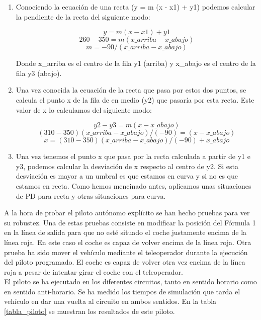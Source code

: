 \begin{enumerate}
    \item Conociendo la ecuación de una recta (y = m (x - x1) + y1) podemos calcular la pendiente de la recta del siguiente modo:
    
        \[ y = m (x - x1) + y1 \]
        \[ 260 - 350 = m (x\_arriba - x\_abajo) \]
        \[ m = -90 / (x\_arriba - x\_abajo) \]
        
     Donde x\_arriba es el centro de la fila y1 (arriba) y x\_abajo es el centro de la fila y3 (abajo).
        
    \item Una vez conocida la ecuación de la recta que pasa por estos dos puntos, se calcula el punto x de la fila de en medio (y2) que pasaría por esta recta. Este valor de x lo calculamos del siguiente modo:
        
        \[ y2 - y3 = m (x - x\_abajo) \]
        \[ (310 - 350) (x\_arriba - x\_abajo) / (-90) = (x - x\_abajo)  \]
        \[ x = (310 - 350) (x\_arriba - x\_abajo) / (-90) + x\_abajo  \]
        
    \item  Una vez tenemos el punto x que pasa por la recta calculada a partir de y1 e y3, podemos calcular la desviación de x respecto al centro de y2. Si esta desviación es mayor a un umbral es que estamos en curva y si no es que estamos en recta. Como hemos mencinado antes, aplicamos unas situaciones de PD para recta y otras situaciones para curva.
    
\end{enumerate}

A la hora de probar el piloto autónomo explícito se han hecho pruebas para ver su robustez. Una de estas pruebas consiste en modificar la posición del Fórmula 1 en la línea de salida para que no esté situado el coche justamente encima de la línea roja. En este caso el coche es capaz de volver encima de la línea roja. Otra prueba ha sido mover el vehículo mediante el teleoperador durante la ejecución del piloto programado. El coche es capaz de volver otra vez encima de la línea roja a pesar de intentar girar el coche con el teleoperador.\\

El piloto se ha ejecutado en los diferentes circuitos, tanto en sentido horario como en sentido anti-horario. Se ha medido los tiempos de simulación que tarda el vehículo en dar una vuelta al circuito en ambos sentidos. En la tabla \ref{tabla_piloto} se muestran los resultados de este piloto.\\



